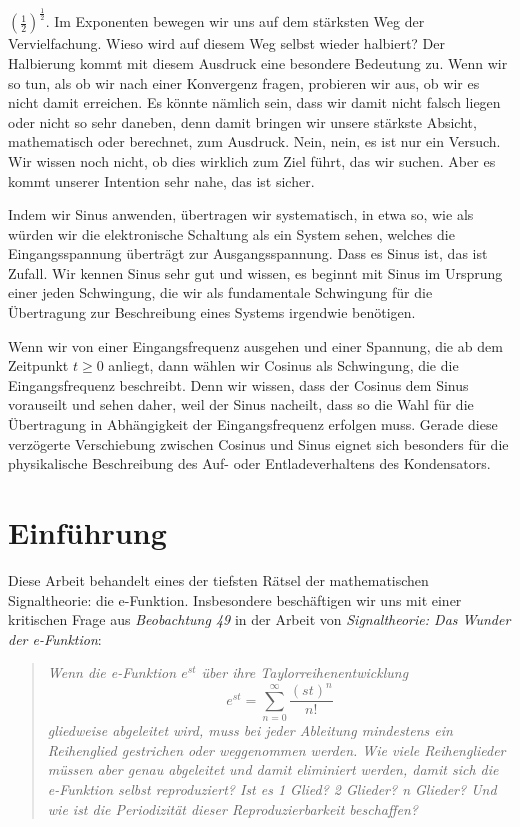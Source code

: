 \documentclass[a4paper,12pt,twoside]{report}
\theoremstyle{definition}
\begin{document}
$(\frac{1}{2})^{\frac{1}{2}}$. Im Exponenten bewegen wir uns auf dem stärksten Weg der Vervielfachung. Wieso wird auf diesem Weg selbst wieder halbiert? Der Halbierung kommt mit diesem Ausdruck eine besondere Bedeutung zu. Wenn wir so tun, als ob wir nach einer Konvergenz fragen, probieren wir aus, ob wir es nicht damit erreichen. Es könnte nämlich sein, dass wir damit nicht falsch liegen oder nicht so sehr daneben, denn damit bringen wir unsere stärkste Absicht, mathematisch oder berechnet, zum Ausdruck. Nein, nein, es ist nur ein Versuch. Wir wissen noch nicht, ob dies wirklich zum Ziel führt, das wir suchen. Aber es kommt unserer Intention sehr nahe, das ist sicher.

Indem wir Sinus anwenden, übertragen wir systematisch, in etwa so, wie als würden wir die elektronische Schaltung als ein System sehen, welches die Eingangsspannung überträgt zur Ausgangsspannung. Dass es Sinus ist, das ist Zufall. Wir kennen Sinus sehr gut und wissen, es beginnt mit Sinus im Ursprung einer jeden Schwingung, die wir als fundamentale Schwingung für die Übertragung zur Beschreibung eines Systems irgendwie benötigen.

Wenn wir von einer Eingangsfrequenz ausgehen und einer Spannung, die ab dem Zeitpunkt $t \geq 0$ anliegt, dann wählen wir Cosinus als Schwingung, die die Eingangsfrequenz beschreibt. Denn wir wissen, dass der Cosinus dem Sinus vorauseilt und sehen daher, weil der Sinus nacheilt, dass so die Wahl für die Übertragung in Abhängigkeit der Eingangsfrequenz erfolgen muss. Gerade diese verzögerte Verschiebung zwischen Cosinus und Sinus eignet sich besonders für die physikalische Beschreibung des Auf- oder Entladeverhaltens des Kondensators.

\section{Einführung}
Diese Arbeit behandelt eines der tiefsten Rätsel der mathematischen Signaltheorie: die e-Funktion. Insbesondere beschäftigen wir uns mit einer kritischen Frage aus \textit{Beobachtung 49} in der Arbeit von \cite{epp_signal} \textit{Signaltheorie: Das Wunder der e-Funktion}:

\begin{quote}
	\textit{Wenn die e-Funktion $e^{st}$ über ihre Taylorreihenentwicklung 
	$$e^{st} = \sum_{n=0}^{\infty} \frac{(st)^n}{n!}$$
	gliedweise abgeleitet wird, muss bei jeder Ableitung mindestens ein Reihenglied gestrichen oder weggenommen werden. Wie viele Reihenglieder müssen aber genau abgeleitet und damit eliminiert werden, damit sich die e-Funktion selbst reproduziert? Ist es 1 Glied? 2 Glieder? n Glieder? Und wie ist die Periodizität dieser Reproduzierbarkeit beschaffen?}
\end{quote}
\end{document}
